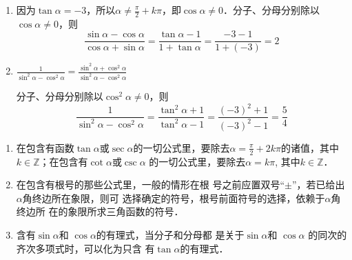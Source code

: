 \begin{solution}
\begin{enumerate}
    \item 因为$\tan\alpha=-3$，所以$\alpha\ne \frac{\pi}{2}+k\pi$，即$\cos\alpha\ne 0$．分子、分母分别除以$\cos\alpha\ne 0$，则
\[\frac{\sin\alpha-\cos\alpha}{\cos\alpha+\sin\alpha}=\frac{\tan\alpha-1}{1+\tan\alpha}=\frac{-3-1}{1+(-3)}=2\]    

\item $\frac{1}{\sin^2\alpha-\cos^2\alpha}=\frac{\sin^2\alpha+\cos^2\alpha}{\sin^2\alpha-\cos^2\alpha}$

分子、分母分别除以$\cos^2\alpha\ne 0$，则
\[\frac{1}{\sin^2\alpha-\cos^2\alpha}=\frac{\tan^2\alpha+1}{\tan^2\alpha-1}=\frac{(-3)^2+1}{(-3)^2-1}=\frac{5}{4}\]
\end{enumerate}  
\end{solution}



\begin{rmk}
\begin{enumerate}
    \item 在包含有函数$\tan\alpha$或$\sec\alpha$的一切公式里，要除去$\alpha=\frac{\pi}{2}+2k\pi$的诸值，其中$k\in\mathbb{Z}$；在包含有$\cot\alpha$或$\csc\alpha$
    的一切公式里，要除去$\alpha=k\pi$, 其中$k\in\mathbb{Z}$．
    \item 在包含有根号的那些公式里，一般的情形在根
    号之前应置双号“$\pm$”，若已给出$\alpha$角终边所在象限，则可
    选择确定的符号，根号前面符号的选择，依赖于$\alpha$角终边所
    在的象限所求三角函数的符号．
    \item 含有$\sin\alpha$和
    $\cos\alpha$的有理式，当分子和分母都
    是关于$\sin\alpha$和
    $\cos\alpha$
    的同次的齐次多项式时，可以化为只含
    有$\tan\alpha$的有理式．
\end{enumerate} 
\end{rmk}


